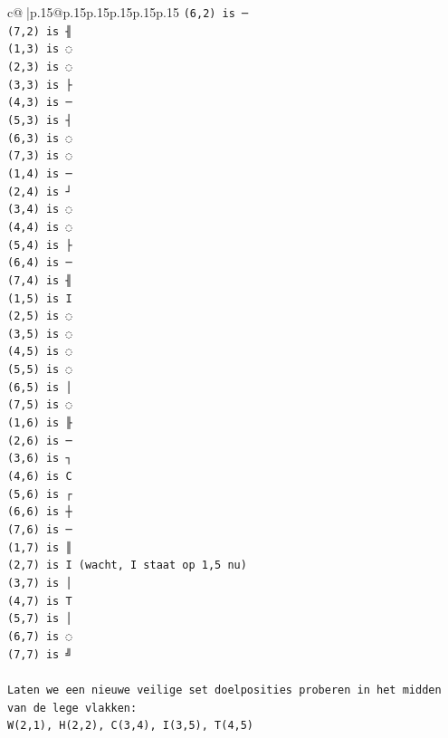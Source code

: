 \documentclass{article}
\begin{document}
{\begin{supertabular}{c@{$\;$}|p{.15\linewidth}@{}p{.15\linewidth}p{.15\linewidth}p{.15\linewidth}p{.15\linewidth}p{.15\linewidth}}
{{{\texttt{(6,2) is ─} \\
\texttt{(7,2) is ╢} \\
\texttt{(1,3) is ◌} \\
\texttt{(2,3) is ◌} \\
\texttt{(3,3) is ├} \\
\texttt{(4,3) is ─} \\
\texttt{(5,3) is ┤} \\
\texttt{(6,3) is ◌} \\
\texttt{(7,3) is ◌} \\
\texttt{(1,4) is ─} \\
\texttt{(2,4) is ┘} \\
\texttt{(3,4) is ◌} \\
\texttt{(4,4) is ◌} \\
\texttt{(5,4) is ├} \\
\texttt{(6,4) is ─} \\
\texttt{(7,4) is ╢} \\
\texttt{(1,5) is I} \\
\texttt{(2,5) is ◌} \\
\texttt{(3,5) is ◌} \\
\texttt{(4,5) is ◌} \\
\texttt{(5,5) is ◌} \\
\texttt{(6,5) is │} \\
\texttt{(7,5) is ◌} \\
\texttt{(1,6) is ╟} \\
\texttt{(2,6) is ─} \\
\texttt{(3,6) is ┐} \\
\texttt{(4,6) is C} \\
\texttt{(5,6) is ┌} \\
\texttt{(6,6) is ┼} \\
\texttt{(7,6) is ─} \\
\texttt{(1,7) is ║} \\
\texttt{(2,7) is I (wacht, I staat op 1,5 nu)} \\
\texttt{(3,7) is │} \\
\texttt{(4,7) is T} \\
\texttt{(5,7) is │} \\
\texttt{(6,7) is ◌} \\
\texttt{(7,7) is ╝} \\
\\ 
\texttt{Laten we een nieuwe veilige set doelposities proberen in het midden van de lege vlakken:} \\
\texttt{W(2,1), H(2,2), C(3,4), I(3,5), T(4,5)} \\
}}}
\end{supertabular}}
\end{document}

